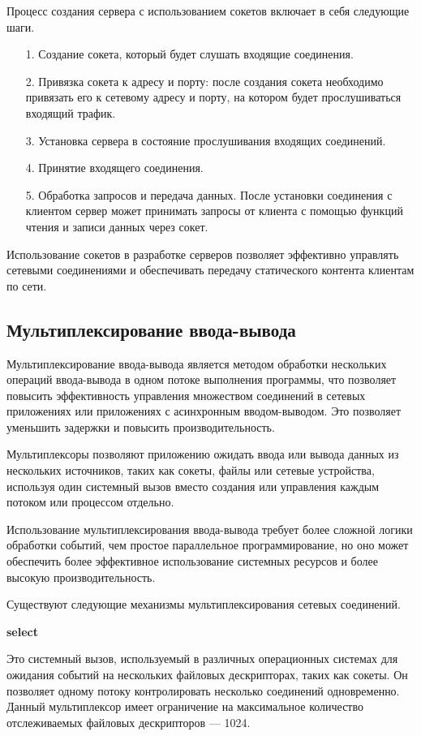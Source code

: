 Процесс создания сервера с использованием сокетов включает в себя следующие шаги.

\begin{itemize}[leftmargin=1.6\parindent]
	\item[1.] Создание сокета, который будет слушать входящие соединения.
	\item[2.] Привязка сокета к адресу и порту: после создания сокета необходимо привязать его к сетевому адресу и порту, на котором будет прослушиваться входящий трафик.
	\item[3.] Установка сервера в состояние прослушивания входящих соединений.
	\item[4.] Принятие входящего соединения.
	\item[5.] Обработка запросов и передача данных. После установки соединения с клиентом сервер может принимать запросы от клиента с помощью функций чтения и записи данных через сокет.
\end{itemize}

Использование сокетов в разработке серверов позволяет эффективно управлять сетевыми соединениями и обеспечивать передачу статического контента клиентам по сети.

\subsection{Мультиплексирование ввода-вывода}
Мультиплексирование ввода-вывода является методом обработки
нескольких операций ввода-вывода в одном потоке выполнения программы,
что позволяет повысить эффективность управления множеством соединений в
сетевых приложениях или приложениях с асинхронным вводом-выводом. Это
позволяет уменьшить задержки и повысить производительность.

Мультиплексоры позволяют приложению ожидать ввода или вывода данных из нескольких источников, таких как сокеты, файлы или сетевые устройства, используя один системный вызов вместо создания или управления каждым потоком или процессом отдельно.

Использование мультиплексирования ввода-вывода требует более сложной логики обработки событий, чем простое параллельное программирование, но оно может обеспечить более эффективное использование системных ресурсов и более высокую производительность.

Существуют следующие механизмы мультиплексирования сетевых соединений.

\textbf{select}

Это системный вызов, используемый в различных операционных
системах для ожидания событий на нескольких файловых дескрипторах,
таких как сокеты. Он позволяет одному потоку контролировать несколько соединений одновременно. Данный мультиплексор имеет ограничение на максимальное количество отслеживаемых файловых дескрипторов —
1024.

